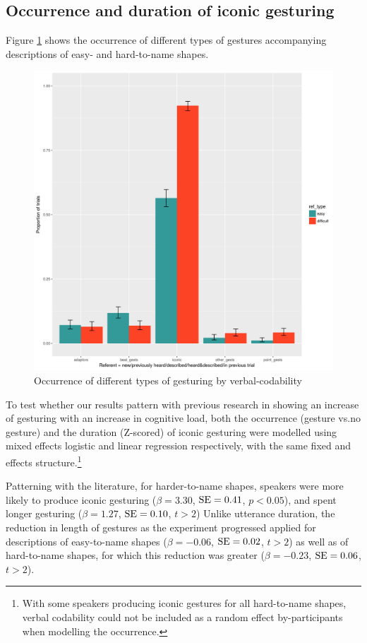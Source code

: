 \documentclass[a4paper,man,natbib]{apa6}
\newcommand{\resultsLog}[3]{$\beta = #1$, $\textnormal{SE} = #2$, $p #3$}
\newcommand{\resultsLM}[3]{$\beta = #1$, $\textnormal{SE} = #2$, $t #3$}
\begin{document}
\subsection{Occurrence and duration of iconic gesturing}
Figure \ref{fig:gtypes} shows the occurrence of different types of gestures accompanying descriptions of easy- and hard-to-name shapes.
\begin{figure}
  \centering
	\includegraphics[width=\linewidth]{e5_gest_occurrence.png}
  \caption{Occurrence of different types of gesturing by verbal-codability}
  \label{fig:gtypes}
\end{figure}
To test whether our results pattern with previous research in showing an increase of gesturing with an increase in cognitive load, both the occurrence (gesture vs.\@ no gesture) and the duration (Z-scored) of iconic gesturing were modelled using mixed effects logistic and linear regression respectively, with the same fixed and effects structure.\footnote{With some speakers producing iconic gestures for all hard-to-name shapes, verbal codability could not be included as a random effect by-participants when modelling the occurrence.}

Patterning with the literature, for harder-to-name shapes, speakers were more likely to produce iconic gesturing (\resultsLog{3.30}{0.41}{<0.05}), and spent longer gesturing (\resultsLM{1.27}{0.10}{>2})
Unlike utterance duration, the reduction in length of gestures as the experiment progressed applied for descriptions of easy-to-name shapes (\resultsLM{-0.06}{0.02}{>2}) as well as of hard-to-name shapes, for which this reduction was greater (\resultsLM{-0.23}{0.06}{>2}).
\end{document}

